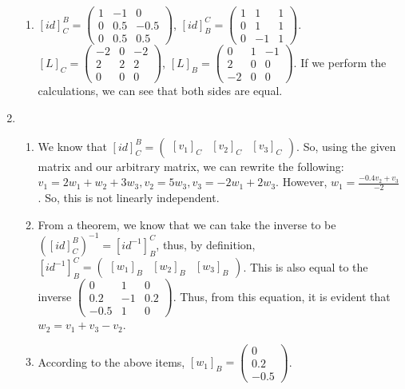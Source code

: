 \documentclass{article}
\begin{document}
\begin{enumerate}
\begin{enumerate}
\item $[id]^B_C = \left(\begin{array}{ccc} 1 & -1 & 0 \\ 0 & 0.5 & -0.5 \\ 0 & 0.5 & 0.5 \end{array}\right)$, $[id]^C_B = \left(\begin{array}{ccc} 1 & 1 & 1 \\ 0 & 1 & 1 \\ 0 & -1 & 1 \end{array}\right)$. $[L]_C = \left(\begin{array}{ccc} -2 & 0 & -2 \\ 2 & 2 & 2 \\ 0 & 0 & 0 \end{array}\right)$, $[L]_B = \left(\begin{array}{ccc} 0 & 1 & -1 \\ 2 & 0 & 0 \\ -2 & 0 & 0 \end{array}\right)$. If we perform the calculations, we can see that both sides are equal.

\end{enumerate}

\item

\begin{enumerate}

\item We know that $[id]^B_C = \left(\begin{array}{ccc} [v_1]_C & [v_2]_C & [v_3]_C \end{array}\right)$. So, using the given matrix and our arbitrary matrix, we can rewrite the following: $v_1 = 2w_1 + w_2 + 3w_3, v_2 = 5w_3, v_3 = -2w_1 + 2w_3$. However, $w_1 = \frac{-0.4v_2 + v_3}{-2}$. So, this is not linearly independent.

\item From a theorem, we know that we can take the inverse to be $([id]^B_C)^{-1} = [id^{-1}]^C_B$, thus, by definition, $[id^{-1}]^C_B = \left(\begin{array}{ccc} [w_1]_B & [w_2]_B & [w_3]_B \end{array}\right)$. This is also equal to the inverse $\left(\begin{array}{ccc} 0 & 1 & 0 \\ 0.2 & -1 & 0.2 \\ -0.5 & 1 & 0 \end{array}\right)$. Thus, from this equation, it is evident that $w_2 = v_1 + v_3 - v_2$.

\item According to the above items, $[w_1]_B = \left(\begin{array}{c} 0 \\ 0.2 \\ -0.5 \end{array}\right)$.

\end{enumerate}

\end{enumerate}
\end{document}
